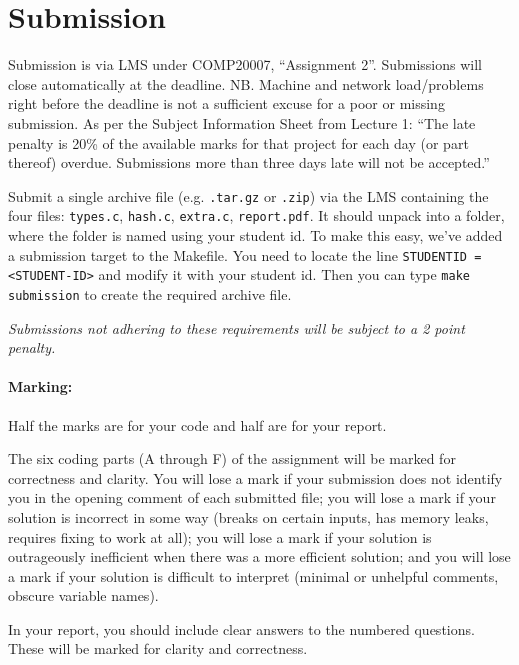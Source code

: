 \documentclass[11pt]{article}
\begin{document}
\section*{Submission}

Submission is via LMS under COMP20007, ``Assignment 2''.
Submissions will close automatically at the deadline.
NB\@. Machine and network load/problems right before the deadline is
not a sufficient excuse for a poor or missing submission.
As per the Subject Information Sheet from Lecture 1: ``The late penalty is 20\%
of the available marks for that project
for each day (or part thereof) overdue.
Submissions more than three days late will not be accepted.''

Submit a single archive file (e.g. \texttt{.tar.gz} or \texttt{.zip}) via the
LMS containing the four files:
\texttt{types.c},
\texttt{hash.c},
\texttt{extra.c},
\texttt{report.pdf}.
It should unpack into a folder, where the folder is named using your student id.
To make this easy, we've added a submission target to the Makefile.
You need to locate the line \texttt{STUDENTID = <STUDENT-ID>} and modify it with your student id.
Then you can type \texttt{make submission} to create the required archive file.

\emph{Submissions not adhering to these requirements will be subject to a 2 point penalty.}

\paragraph{Marking:}
Half the marks are for your code and half are for your report.

The six coding parts (A through F) of the assignment will be marked for correctness and clarity.
You will lose a mark if your submission does not identify you in the opening comment of each submitted file;
you will lose a mark if your solution is incorrect in some way
(breaks on certain inputs, has memory leaks, requires fixing to work at all);
you will lose a mark if your solution is outrageously inefficient when there was a more efficient solution;
and you will lose a mark if your solution is difficult to interpret
(minimal or unhelpful comments, obscure variable names).

In your report, you should include clear answers to the numbered questions.  These will be marked for clarity and correctness.
\end{document}
